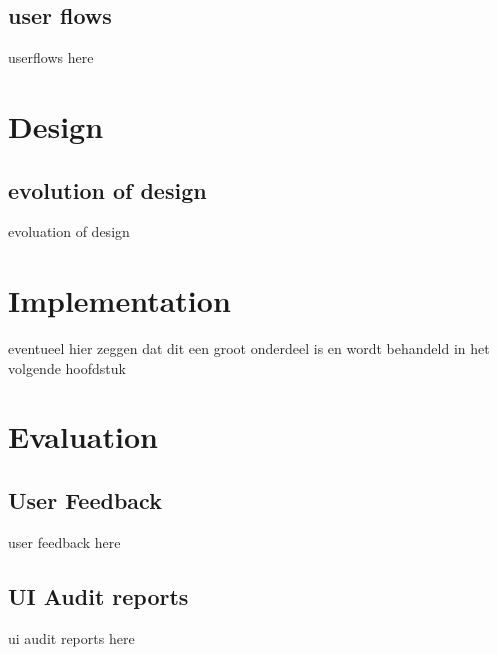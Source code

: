     \subsection{user flows}
    userflows here
    
\section{Design}
    \subsection{evolution of design}
    evoluation of design

\section{Implementation}
    eventueel hier zeggen dat dit een groot onderdeel is en wordt behandeld in het volgende hoofdstuk

\section{Evaluation}
    \subsection{User Feedback}
    user feedback here
    \subsection{UI Audit reports}
    ui audit reports here
    
